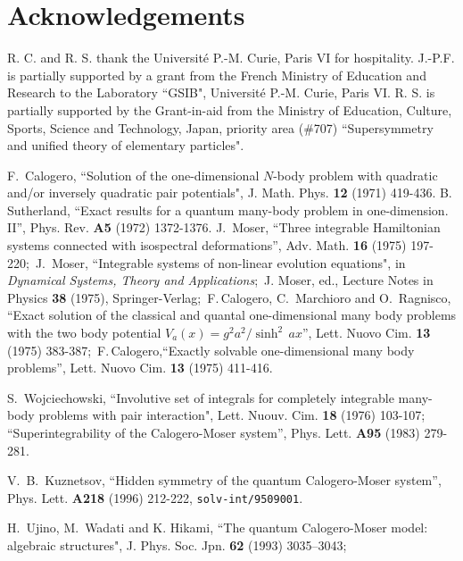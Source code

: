 \documentclass[a4paper,12pt]{article}
\begin{document}
\section*{Acknowledgements}
\setcounter{equation}{0}
R. C. and R. S. thank the Universit\'e P.-M. Curie, Paris VI
for hospitality.
        J.-P.F. is partially supported by a grant from the
French Ministry of Education and Research to the Laboratory
``GSIB", Universit\'e P.-M. Curie, Paris VI.
        R. S. is partially supported  by the Grant-in-aid from the
Ministry of Education, Culture, Sports, Science and Technology, Japan,
priority area (\#707) ``Supersymmetry and unified theory of elementary
particles".
\begin{thebibliography}{99}
  F.\, Calogero, ``Solution of the one-dimensional
\(N\)-body problem with quadratic and/or inversely quadratic pair
potentials", J. Math. Phys. {\bf 12} (1971) 419-436.
B.\, Sutherland, ``Exact results for a quantum many-body problem in
one-dimension. II'', Phys. Rev. {\bf A5} (1972) 1372-1376.
J.\, Moser, ``Three integrable Hamiltonian systems connected with
isospectral deformations'',  Adv. Math. {\bf 16} (1975) 197-220;\
J.\, Moser,  ``Integrable systems of non-linear evolution equations",
in {\it Dynamical Systems, Theory and Applications\/};\
J. Moser, ed., Lecture Notes in Physics {\bf 38} (1975),
Springer-Verlag;\
F.\,Calogero, C.\, Marchioro and O.\, Ragnisco, ``Exact solution of the
classical and quantal one-dimensional many body problems with
the two body potential \(V_{a}(x)=g^2a^2/\sinh^2\,ax\)'', Lett. Nuovo
Cim. {\bf 13} (1975) 383-387;\
F.\,Calogero,``Exactly solvable one-dimensional many body problems'',
Lett. Nuovo Cim. {\bf 13} (1975) 411-416.

\bibitem{Woj}
S.\, Wojciechowski, ``Involutive set of integrals for completely
integrable many-body problems with pair interaction",
Lett. Nuouv. Cim. {\bf 18} (1976) 103-107;
``Superintegrability of the Calogero-Moser system'',
Phys. Lett. {\bf A95} (1983) 279-281.


\bibitem{Kuz}
V.~B.~Kuznetsov,
``Hidden symmetry of the quantum Calogero-Moser system'',
Phys. Lett. {\bf A218} (1996) 212-222, {\tt solv-int/9509001}.

\bibitem{UjWa}
 H.\, Ujino,  M.\, Wadati and K. Hikami, ``The quantum Calogero-Moser
model: algebraic structures", J. Phys. Soc. Jpn.
 {\bf 62} (1993) 3035--3043;




\end{thebibliography}
\end{document}
